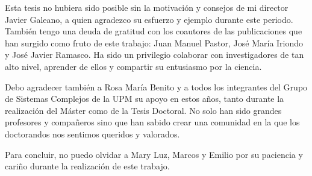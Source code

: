 \documentclass[
11pt, %
spanish, %
onehalfspacing, %
]{MastersDoctoralThesis_custom} %
\begin{document}
\clearpage
\begin{acknowledgements}
\addchaptertocentry{\acknowledgementname} %

Esta tesis no hubiera sido posible sin la motivación y consejos de mi director Javier Galeano, a quien
agradezco su esfuerzo y ejemplo durante este periodo. También tengo una deuda de gratitud con los coautores
de las publicaciones que han surgido como fruto de este trabajo: Juan Manuel Pastor,
José María Iriondo y José Javier Ramasco. Ha sido un privilegio colaborar con investigadores de tan alto nivel,
aprender de ellos y compartir su entusiasmo por la ciencia.

Debo agradecer también a Rosa María Benito y a todos los integrantes del Grupo de Sistemas Complejos
de la UPM su apoyo en estos años, tanto durante la realización del Máster como de la Tesis Doctoral.
No solo han sido grandes profesores y compañeros sino que han sabido crear una comunidad en la que
los doctorandos nos sentimos queridos y valorados.

Para concluir, no puedo olvidar a Mary Luz, Marcos y Emilio por su paciencia y cariño
durante la realización de este trabajo.

\end{acknowledgements}
\clearpage

\end{document}
